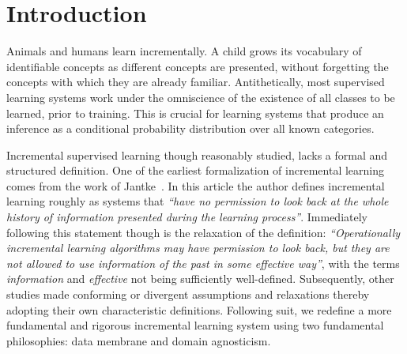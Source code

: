 \documentclass[10pt,twocolumn,letterpaper]{article}
\begin{document}
	
	
	
	\section{Introduction}
	\label{sec:intro}
	
	Animals and humans learn incrementally. 
	A child grows its vocabulary of identifiable concepts as different concepts are presented, without forgetting the concepts with which they are already familiar. 
	Antithetically, most supervised learning systems work under the omniscience of the existence of all classes to be learned, prior to training.
	This is crucial for learning systems that produce an inference as a conditional probability distribution over all known categories.
	
	Incremental supervised learning though reasonably studied, lacks a formal and structured definition. 
	One of the earliest formalization of incremental learning comes from the work of Jantke~\cite{jantke1993types}. 
	In this article the author defines incremental learning roughly as systems that \emph{``have no permission to look back at the whole history of information presented during the learning process''}. 
	Immediately following this statement though is the relaxation of the definition: \emph{``Operationally incremental learning algorithms may have permission to look back, but they are not allowed to use information of the past in some effective way''}, with the terms \emph{information} and \emph{effective} not being sufficiently well-defined.  
	Subsequently, other studies made conforming or divergent assumptions and relaxations thereby adopting their own characteristic definitions.
	Following suit, we redefine a more fundamental and rigorous incremental learning system using two fundamental philosophies: data membrane and domain agnosticism. 
	
\end{document}
